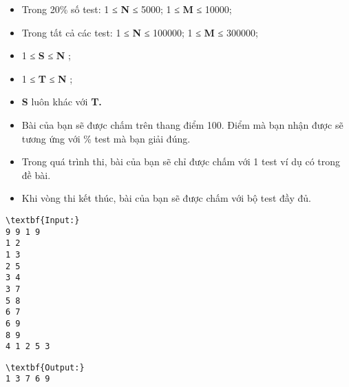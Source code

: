 \begin{itemize}
	\item Trong 20\% số test: 1 ≤ \textbf{ N } ≤ 5000; 1 ≤ \textbf{ M } ≤ 10000;
	\item Trong tất cả các test: 1 ≤ \textbf{ N } ≤ 100000; 1 ≤ \textbf{ M } ≤ 300000;
	\item 1 ≤ \textbf{ S } ≤ \textbf{ N } ;
	\item 1 ≤ \textbf{ T } ≤ \textbf{ N } ;
	\item \textbf{S } luôn khác với \textbf{ T. }
\end{itemize}
\begin{itemize}
	\item Bài của bạn sẽ được chấm trên thang điểm 100. Điểm mà bạn nhận được sẽ tương ứng với \% test mà bạn giải đúng.
	\item Trong quá trình thi, bài của bạn sẽ chỉ được chấm với 1 test ví dụ có trong đề bài.
	\item Khi vòng thi kết thúc, bài của bạn sẽ được chấm với bộ test đầy đủ.
\end{itemize}
\begin{itemize}
\end{itemize}
\begin{verbatim}
\textbf{Input:}
9 9 1 9
1 2
1 3
2 5
3 4
3 7
5 8
6 7
6 9
8 9
4 1 2 5 3\end{verbatim}
\begin{verbatim}
\textbf{Output:}
1 3 7 6 9\end{verbatim}